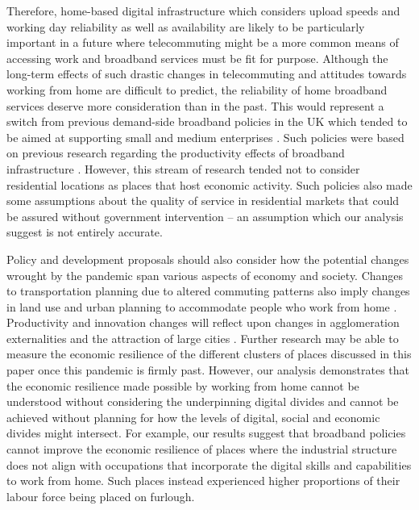 \documentclass[]{interact}
\theoremstyle{plain}%
\theoremstyle{definition}
\theoremstyle{remark}
\begin{document}
Therefore, home-based digital infrastructure which considers upload
speeds and working day reliability as well as availability are likely to
be particularly important in a future where telecommuting might be a
more common means of accessing work and broadband services must be fit
for purpose. Although the long-term effects of such drastic changes in
telecommuting and attitudes towards working from home are difficult to
predict, the reliability of home broadband services deserve more
consideration than in the past. This would represent a switch from
previous demand-side broadband policies in the UK which tended to be
aimed at supporting small and medium enterprises
\citep{HENDERSON2020102024}. Such policies were based on previous
research regarding the productivity effects of broadband infrastructure
\citep{DESTEFANO2018110}. However, this stream of research tended not to
consider residential locations as places that host economic activity.
Such policies also made some assumptions about the quality of service in
residential markets that could be assured without government
intervention -- an assumption which our analysis suggest is not entirely
accurate.

Policy and development proposals should also consider how the potential
changes wrought by the pandemic span various aspects of economy and
society. Changes to transportation planning due to altered commuting
patterns also imply changes in land use and urban planning to
accommodate people who work from home
\citep{BUDNITZ2020102713, ELLDER2020102777}. Productivity and innovation
changes will reflect upon changes in agglomeration externalities and the
attraction of large cities \citep{econobs}. Further research may be able
to measure the economic resilience of the different clusters of places
discussed in this paper once this pandemic is firmly past. However, our
analysis demonstrates that the economic resilience made possible by
working from home cannot be understood without considering the
underpinning digital divides and cannot be achieved without planning for
how the levels of digital, social and economic divides might intersect.
For example, our results suggest that broadband policies cannot improve
the economic resilience of places where the industrial structure does
not align with occupations that incorporate the digital skills and
capabilities to work from home. Such places instead experienced higher
proportions of their labour force being placed on furlough.
\end{document}
